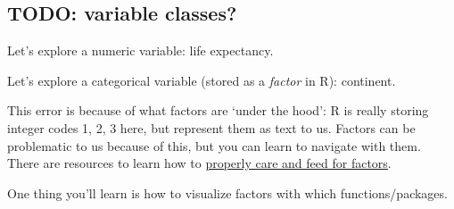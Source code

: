 \documentclass[]{book}
\newenvironment{Shaded}{\begin{snugshade}}{\end{snugshade}}
\newcommand{\KeywordTok}[1]{\textcolor[rgb]{0.13,0.29,0.53}{\textbf{#1}}}
\newcommand{\CommentTok}[1]{\textcolor[rgb]{0.56,0.35,0.01}{\textit{#1}}}
\newcommand{\OperatorTok}[1]{\textcolor[rgb]{0.81,0.36,0.00}{\textbf{#1}}}
\newcommand{\NormalTok}[1]{#1}
\theoremstyle{definition}
\theoremstyle{definition}
\theoremstyle{definition}
\theoremstyle{remark}
\begin{document}
\subsection{TODO: variable classes?}\label{todo-variable-classes}

Let's explore a numeric variable: life expectancy.

\begin{Shaded}
\end{Shaded}

Let's explore a categorical variable (stored as a \emph{factor} in R):
continent.

\begin{Shaded}
\end{Shaded}

This error is because of what factors are `under the hood': R is really
storing integer codes 1, 2, 3 here, but represent them as text to us.
Factors can be problematic to us because of this, but you can learn to
navigate with them. There are resources to learn how to
\href{http://stat545.com/block014_factors.html}{properly care and feed
for factors}.

One thing you'll learn is how to visualize factors with which
functions/packages.

\begin{Shaded}
\end{Shaded}
\end{document}
